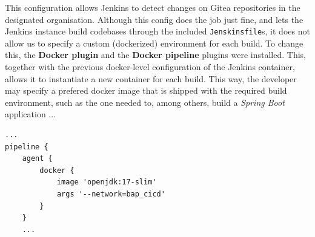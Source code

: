 \noindent This configuration allows Jenkins to detect changes on Gitea repositories in the
designated organisation. Although this config does the job just fine, and lets
the Jenkins instance build codebases through the included \verb|Jenskinsfile|s,
it does not allow us to specify a custom (dockerized) environment for each build.
To change this, the \textbf{Docker plugin} and the \textbf{Docker pipeline}
plugins were installed. This, together with the previous docker-level configuration
of the Jenkins container, allows it to instantiate a new container for each build.
This way, the developer may specify a prefered docker image that is shipped with the
required build environment, such as the one needed to, among others, build a \textit{Spring Boot}
application $\dots$
\begin{lstlisting}
...
pipeline {
    agent {
        docker {
            image 'openjdk:17-slim'
            args '--network=bap_cicd'
        }
    }
    ...
\end{lstlisting}
